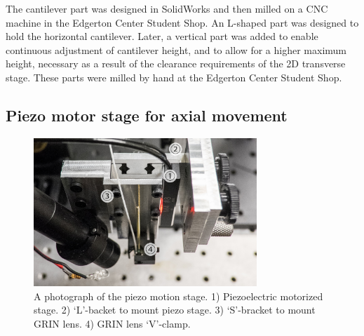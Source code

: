 
The cantilever part was designed in SolidWorks and then milled on a CNC machine in the Edgerton Center Student Shop. An L-shaped part was designed to hold the horizontal cantilever. Later, a vertical part was added to enable continuous adjustment of cantilever height, and to allow for a higher maximum height, necessary as a result of the clearance requirements of the 2D transverse stage. These parts were milled by hand at the Edgerton Center Student Shop.

\subsection{Piezo motor stage for axial movement}



\begin{figure}[h!]
\centering
\includegraphics[width=0.75\textwidth]{Images/Photographs/DSCF1714_an.jpg}
\caption[Photograph of the piezo motion stage.]{A photograph of the piezo motion stage. 1) Piezoelectric motorized stage. 2) `L'-backet to mount piezo stage. 3) `S'-bracket to mount GRIN lens. 4) GRIN lens `V'-clamp.}
\end{figure}

